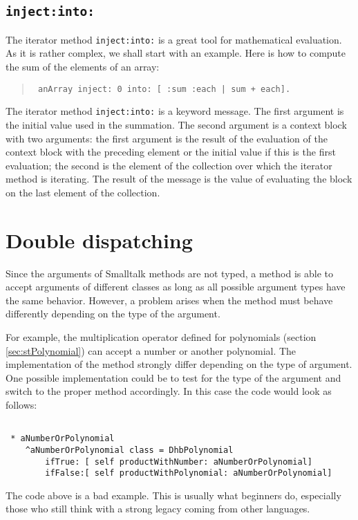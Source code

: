 \documentclass[twoside]{book}
\begin{document}
\subsection{\tt inject:into:}
\label{sec:injectinto} The iterator method {\tt inject:into:} is a
great tool for mathematical evaluation. As it is rather complex,
we shall start with an example. Here is how to compute the sum of
the elements of an array:
\begin{quote}
\begin{verbatim}
 anArray inject: 0 into: [ :sum :each | sum + each].
\end{verbatim}
\end{quote}
The iterator method {\tt inject:into:} is a keyword message. The
first argument is the initial value used in the summation. The
second argument is a context block with two arguments: the first
argument is the result of the evaluation of the context block with
the preceding element or the initial value if this is the first
evaluation; the second is the element of the collection over which
the iterator method is iterating. The result of  the message is
the value of evaluating the block on the last element of the
collection.

\section{Double dispatching}
\label{sec:doubledisp} Since the arguments of Smalltalk methods
are not typed, a method is able to accept arguments of different
classes as long as all possible argument types have the same
behavior. However, a problem arises when the method must behave
differently depending on the type of the argument.

For example, the multiplication operator defined for polynomials
(\cf section \ref{sec:stPolynomial}) can accept a number or
another polynomial. The implementation of the method strongly
differ depending on the type of argument. One possible
implementation could be to test for the type of the argument and
switch to the proper method accordingly. In this case the code
would look as follows:
\begin{codeExample}
\begin{verbatim}

 * aNumberOrPolynomial
    ^aNumberOrPolynomial class = DhbPolynomial
        ifTrue: [ self productWithNumber: aNumberOrPolynomial]
        ifFalse:[ self productWithPolynomial: aNumberOrPolynomial]
\end{verbatim}
\end{codeExample}
The code above is a bad example. This is usually what beginners
do, especially those who still think with a strong legacy coming
from other languages.
\end{document}
